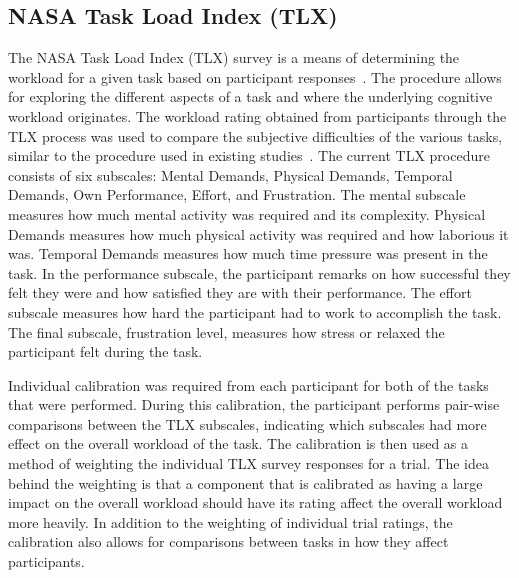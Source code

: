 \documentclass[11pt]{article}
\begin{document}
	
	\subsection{NASA Task Load Index (TLX)}
	The NASA Task Load Index (TLX) survey is a means of determining the workload for a given task based on participant responses~\cite{}. The procedure allows for exploring the different aspects of a task and where the underlying cognitive workload originates. The workload rating obtained from participants through the TLX process was used to compare the subjective difficulties of the various tasks, similar to the procedure used in existing studies~\cite{}. The current TLX procedure consists of six subscales: Mental Demands, Physical Demands, Temporal Demands, Own Performance, Effort, and Frustration. The mental subscale measures how much mental activity was required and its complexity. Physical Demands measures how much physical activity was required and how laborious it was. Temporal Demands measures how much time pressure was present in the task. In the performance subscale, the participant remarks on how successful they felt they were and how satisfied they are with their performance. The effort subscale measures how hard the participant had to work to accomplish the task. The final subscale, frustration level, measures how stress or relaxed the participant felt during the task. 
	
	Individual calibration was required from each participant for both of the tasks that were performed. During this calibration, the participant performs pair-wise comparisons between the TLX subscales, indicating which subscales had more effect on the overall workload of the task. The calibration is then used as a method of weighting the individual TLX survey responses for a trial. The idea behind the weighting is that a component that is calibrated as having a large impact on the overall workload should have its rating affect the overall workload more heavily. In addition to the weighting of individual trial ratings, the calibration also allows for comparisons between tasks in how they affect participants.
		
\end{document}
